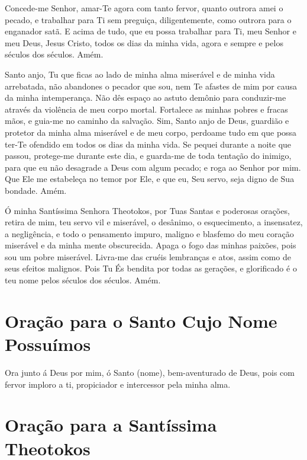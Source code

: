 \documentclass{subfiles}
\begin{document}
Concede-me Senhor, amar-Te agora com tanto fervor, quanto outrora amei o pecado,
e trabalhar para Ti sem preguiça, diligentemente, como outrora para o enganador
satã. E acima de tudo, que eu possa trabalhar para Ti, meu Senhor e meu Deus,
Jesus Cristo, todos os dias da minha vida, agora e sempre e pelos séculos dos
séculos. Amém.


Santo anjo, Tu que ficas ao lado de minha alma miserável e de minha vida
arrebatada, não abandones o pecador que sou, nem Te afastes de mim por causa da
minha intemperança. Não dês espaço ao astuto demônio para conduzir-me através da
violência de meu corpo mortal. Fortalece as minhas pobres e fracas mãos, e
guia-me no caminho da salvação. Sim, Santo anjo de Deus, guardião e protetor da
minha alma miserável e de meu corpo, perdoame tudo em que possa ter-Te ofendido
em todos os dias da minha vida. Se pequei durante a noite que passou, protege-me
durante este dia, e guarda-me de toda tentação do inimigo, para que eu não
desagrade a Deus com algum pecado; e roga ao Senhor por mim. Que Ele me
estabeleça no temor por Ele, e que eu, Seu servo, seja digno de Sua bondade.
Amém.


Ó minha Santíssima Senhora Theotokos, por Tuas Santas e poderosas orações,
retira de mim, teu servo vil e miserável, o desânimo, o esquecimento, a
insensatez, a negligência, e todo o pensamento impuro, maligno e blasfemo do meu
coração miserável e da minha mente obscurecida. Apaga o fogo das minhas paixões,
pois sou um pobre miserável. Livra-me das cruéis lembranças e atos, assim como
de seus efeitos malignos. Pois Tu És bendita por todas as gerações, e
glorificado é o teu nome pelos séculos dos séculos. Amém.

\section*{Oração para o Santo Cujo Nome Possuímos}

Ora junto á Deus por mim, ó Santo (nome), bem-aventurado de Deus,
pois com fervor imploro a ti, propiciador e intercessor pela minha alma.

\section*{Oração para a Santíssima Theotokos}
\end{document}

